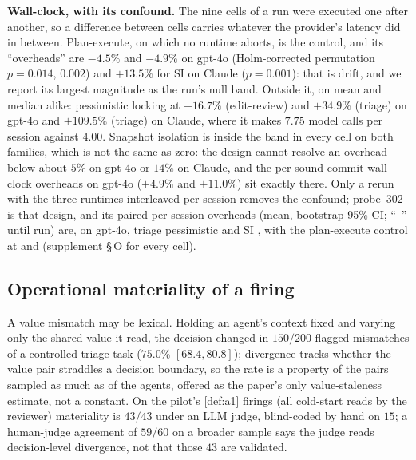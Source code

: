 \smallskip\noindent\textbf{Wall-clock, with its confound.} The nine cells of
a run were executed one after another, so a difference between cells carries
whatever the provider's latency did in between. Plan-execute, on which no
runtime aborts, is the control, and its ``overheads'' are $-4.5\%$ and
$-4.9\%$ on gpt-4o (Holm-corrected permutation $p=0.014$, $0.002$) and
$+13.5\%$ for SI on Claude ($p=0.001$): that is drift, and we report its
largest magnitude as the run's null band. Outside it, on mean and median
alike: pessimistic locking at $+16.7\%$ (edit-review) and $+34.9\%$ (triage)
on gpt-4o and $+109.5\%$ (triage) on Claude, where it makes $7.75$ model
calls per session against $4.00$. Snapshot isolation is inside the band in
every cell on both families, which is not the same as zero: the design cannot
resolve an overhead below about $5\%$ on gpt-4o or $14\%$ on Claude, and the
per-sound-commit wall-clock overheads on gpt-4o ($+4.9\%$ and $+11.0\%$) sit
exactly there. Only a rerun with the three runtimes interleaved per session
removes the confound; probe~302 is that design, and its paired per-session
overheads (mean, bootstrap 95\% CI; ``--'' until run) are, on gpt-4o,
triage pessimistic \WallclockPairedGptTriagePess{} and SI
\WallclockPairedGptTriageSI, with the plan-execute control at
\WallclockPairedGptPlanExecutePess{} and \WallclockPairedGptPlanExecuteSI{}
(supplement \S\,O for every cell).

\subsection{Operational materiality of a firing}
\label{sec:materiality}
A value mismatch may be lexical. Holding an agent's context fixed and varying
only the shared value it read, the decision changed in $150/200$ flagged
mismatches of a controlled triage task ($75.0\%$ $[68.4, 80.8]$); divergence
tracks whether the value pair straddles a decision boundary, so the rate is
a property of the pairs sampled as much as of the agents, offered as the
paper's only value-staleness estimate, not a constant. On the pilot's
\cref{def:a1} firings (all cold-start reads by the reviewer) materiality is
$43/43$ under an LLM judge, blind-coded by hand on $15$; a human-judge
agreement of $59/60$ on a broader sample says the judge reads decision-level
divergence, not that those $43$ are validated.

